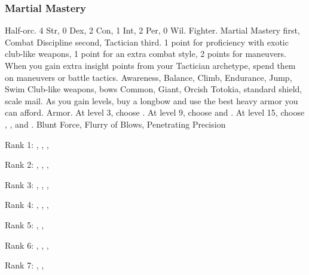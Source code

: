         \subsubsection{Martial Mastery}
             Half-orc.
             4 Str, 0 Dex, 2 Con, 1 Int, 2 Per, 0 Wil.
             Fighter.
             Martial Mastery first, Combat Discipline second, Tactician third.
             1 point for proficiency with exotic club-like weapons, 1 point for an extra combat style, 2 points for maneuvers.
                When you gain extra insight points from your Tactician archetype, spend them on maneuvers or battle tactics.
             Awareness, Balance, Climb, Endurance, Jump, Swim
             Club-like weapons, bows
             Common, Giant, Orcish
             Totokia, standard shield, scale mail. As you gain levels, buy a longbow and use the best heavy armor you can afford.
             Armor.
                At level 3, choose .
                At level 9, choose  and .
                At level 15, choose , , and .
             Blunt Force, Flurry of Blows, Penetrating Precision
            \begin{raggeditemize}
                \item Rank 1: , , , 
                \item Rank 2: , , , 
                \item Rank 3: , , , 
                \item Rank 4: , , , 
                \item Rank 5: , , 
                \item Rank 6: , , , 
                \item Rank 7: , , 
            \end{raggeditemize}
